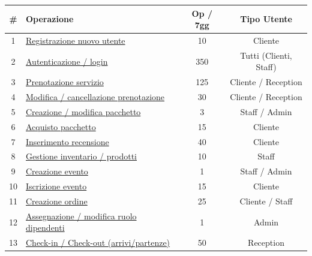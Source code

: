 \documentclass[a4paper,12pt]{report}
\begin{document}
\begin{table}[H]
	\centering
	\small
	\renewcommand{\arraystretch}{1.12}
	\begin{tabularx}{\textwidth}{|c|>{\raggedright\arraybackslash}X|c|c|}
		\hline
		\rowcolor{gray!20}
		\textbf{\#} & \textbf{Operazione}                                                    & \textbf{Op / 7gg} & \textbf{Tipo Utente}   \\
		\hline
		1           & \hyperref[op1]{Registrazione nuovo utente}                             & 10             & Cliente                \\
		\hline
		2           & \hyperref[op2]{Autenticazione / login}                                 & 350          & Tutti (Clienti, Staff) \\
		\hline
		3           & \hyperref[op3]{Prenotazione servizio}                                  & 125           & Cliente / Reception    \\
		\hline
		4           & \hyperref[op4]{Modifica / cancellazione prenotazione}                  & 30            & Cliente / Reception    \\
		\hline
		5           & \hyperref[op5]{Creazione / modifica pacchetto}                         & 3              & Staff / Admin          \\
		\hline
		6           & \hyperref[op6]{Acquisto pacchetto}                                     & 15             & Cliente                \\
		\hline
		7           & \hyperref[op7]{Inserimento recensione}                                 & 40            & Cliente                \\
		\hline
		8           & \hyperref[op8]{Gestione inventario / prodotti}                         & 10             & Staff                  \\
		\hline
		9           & \hyperref[op9]{Creazione evento}                                       & 1              & Staff / Admin          \\
		\hline
		10          & \hyperref[op10]{Iscrizione evento}                                     & 15             & Cliente                \\
		\hline
		11          & \hyperref[op11]{Creazione ordine}                           & 25            & Cliente / Staff        \\
		\hline
		12          & \hyperref[op12]{Assegnazione / modifica ruolo dipendenti}              & 1              & Admin                  \\
		\hline
		13          & \hyperref[op13]{Check-in / Check-out (arrivi/partenze)}                & 50            & Reception              \\

\end{tabularx}
\end{table}
\end{document}
